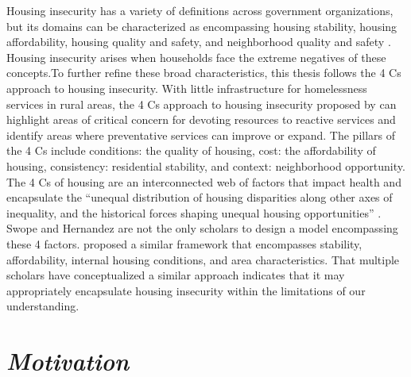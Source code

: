 Housing insecurity has a variety of definitions across government organizations, but its domains can be characterized as encompassing housing stability, housing affordability, housing quality and safety, and neighborhood quality and safety \citep{cox_road_2019}. Housing insecurity arises when households face the extreme negatives of these concepts.To further refine these broad characteristics, this thesis follows the 4 Cs approach to housing insecurity. With little infrastructure for homelessness services in rural areas, the 4 Cs approach to housing insecurity proposed by \citet{hernandez_housing_2019} can highlight areas of critical concern for devoting resources to reactive services and identify areas where preventative services can improve or expand. The pillars of the 4 Cs include conditions: the quality of housing, cost: the affordability of housing, consistency: residential stability, and context: neighborhood opportunity. The 4 Cs of housing are an interconnected web of factors that impact health and encapsulate the “unequal distribution of housing disparities along other axes of inequality, and the historical forces shaping unequal housing opportunities” \citep[1]{hernandez_housing_2019}. Swope and Hernandez are not the only scholars to design a model encompassing these 4 factors. \citet{metzger_fair_2017} proposed a similar framework that encompasses stability, affordability, internal housing conditions, and area characteristics. That multiple scholars have conceptualized a similar approach indicates that it may appropriately encapsulate housing insecurity within the limitations of our understanding.

 

\section{\textit{Motivation}} 

